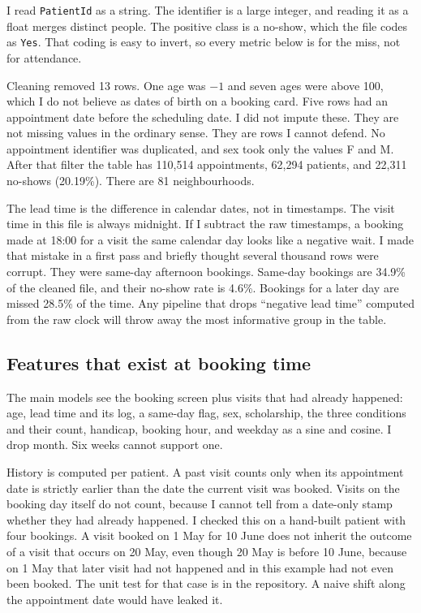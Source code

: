 \documentclass[conference]{IEEEtran}
\begin{document}
I read \texttt{PatientId} as a string. The identifier is a large integer, and reading it as a float merges distinct people. The positive class is a no-show, which the file codes as \texttt{Yes}. That coding is easy to invert, so every metric below is for the miss, not for attendance.

Cleaning removed 13 rows. One age was $-1$ and seven ages were above 100, which I do not believe as dates of birth on a booking card. Five rows had an appointment date before the scheduling date. I did not impute these. They are not missing values in the ordinary sense. They are rows I cannot defend. No appointment identifier was duplicated, and sex took only the values F and M. After that filter the table has 110,514 appointments, 62,294 patients, and 22,311 no-shows (20.19\%). There are 81 neighbourhoods.

The lead time is the difference in calendar dates, not in timestamps. The visit time in this file is always midnight. If I subtract the raw timestamps, a booking made at 18:00 for a visit the same calendar day looks like a negative wait. I made that mistake in a first pass and briefly thought several thousand rows were corrupt. They were same-day afternoon bookings. Same-day bookings are 34.9\% of the cleaned file, and their no-show rate is 4.6\%. Bookings for a later day are missed 28.5\% of the time. Any pipeline that drops ``negative lead time'' computed from the raw clock will throw away the most informative group in the table.

\subsection{Features that exist at booking time}
The main models see the booking screen plus visits that had already happened: age, lead time and its log, a same-day flag, sex, scholarship, the three conditions and their count, handicap, booking hour, and weekday as a sine and cosine. I drop month. Six weeks cannot support one.

History is computed per patient. A past visit counts only when its appointment date is strictly earlier than the date the current visit was booked. Visits on the booking day itself do not count, because I cannot tell from a date-only stamp whether they had already happened. I checked this on a hand-built patient with four bookings. A visit booked on 1 May for 10 June does not inherit the outcome of a visit that occurs on 20 May, even though 20 May is before 10 June, because on 1 May that later visit had not happened and in this example had not even been booked. The unit test for that case is in the repository. A naive shift along the appointment date would have leaked it.
\end{document}
